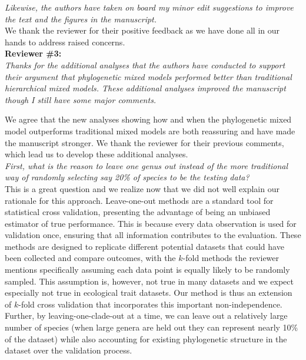 \documentclass[11pt]{article}
\begin{document}
\emph{Likewise, the authors have taken on board my minor edit suggestions to improve the text and the figures in the manuscript.}\\

We thank the reviewer for their positive feedback as we have done all in our hands to address raised concerns.\\

{\bf Reviewer \#3:}\\ 


\emph{Thanks for the additional analyses that the authors have conducted to support their argument that phylogenetic mixed models performed better than traditional hierarchical mixed models. These additional analyses improved the manuscript though I still have some major comments.}

We agree that the new analyses showing how and when the phylogenetic mixed model outperforms traditional mixed models are both reassuring and have made the manuscript stronger. We thank the reviewer for their previous comments, which lead us to develop these additional analyses. \\


\emph{First, what is the reason to leave one genus out instead of the more traditional way of randomly selecting say 20\% of species to be the testing data? }\\

This is a great question and we realize now that we did not well explain our rationale for this approach. Leave-one-out methods are a standard tool for statistical cross validation, presenting the advantage of being an unbiased estimator of true performance. This is because every data observation is used for validation once, ensuring that all information contributes to the evaluation. These methods are designed to replicate different potential datasets that could have been collected and compare outcomes, with the $k$-fold methods the reviewer mentions specifically assuming each data point is equally likely to be randomly sampled. This assumption is, however, not true in many datasets and we expect especially not true in ecological trait datasets. Our method is thus an extension of  $k$-fold cross validation that incorporates this important non-independence. Further, by leaving-one-clade-out at a time, we can leave out a relatively large number of species (when large genera are held out they can represent nearly 10\% of the dataset) while also accounting for existing phylogenetic structure in the dataset over the validation process.
\end{document}
